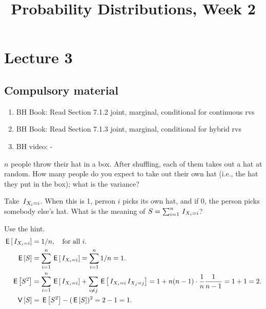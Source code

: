 


\title{Probability Distributions, Week 2}


\maketitle
\toccontents


\section{Lecture 3}
\label{sec:lecture-1}

\subsection{Compulsory material}


\begin{enumerate}
\item BH Book: Read Section 7.1.2 joint, marginal, conditional for continuous rvs
\item BH Book: Read Section 7.1.3 joint, marginal, conditional for hybrid rvs
\item BH video: -
\end{enumerate}

\begin{exercise}
$n$ people throw their hat in a box.
After shuffling, each of them takes out a hat at random.
How many people do you expect to take out their own hat (i.e., the hat they put in the box); what is the variance?
\begin{hint}
Take $\,I_{X_i=i}$. When this is 1, person $i$ picks its own hat, and if 0, the person picks somebody else's hat. What is the meaning of $S=\sum_{i=1}^n \,I_{X_i=i}$?
\end{hint}
\begin{solution}
Use the hint.
\begin{align*}
\,\mathsf{E}\left[\,I_{X_i=i}\right] &= 1/n, \quad \text{for all } i. \\
  \,\mathsf{E}\left[S\right] &= \sum_{i=1}^n \,\mathsf{E}\left[\,I_{X_{i}=i}\right] = \sum_{i=1}^n 1/n = 1. \\
  \,\mathsf{E}\left[S^{2}\right] &= \sum_{i=1}^n \,\mathsf{E}\left[\,I_{X_{i}=i}\right] + \sum_{i \neq j} \,\mathsf{E}\left[\,I_{X_{i}=i}\,I_{X_{j}=j}\right] = 1 + n(n-1)\cdot \frac{1}{n}\frac{1}{n-1} = 1 + 1 =2.\\
  \,\mathsf{V}\left[S\right] &= \,\mathsf{E}\left[S^{2}\right]  - (\,\mathsf{E}\left[S\right])^{2} = 2 - 1 = 1.
\end{align*}
\end{solution}
\end{exercise}



